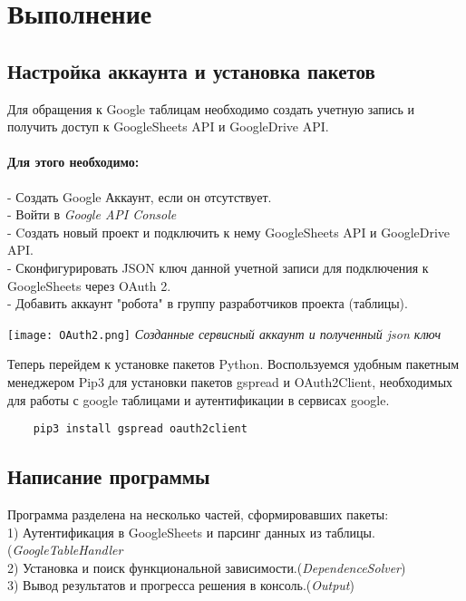 \newpage
	\section*{\centering Выполнение}
	
	\subsection*{Настройка аккаунта и установка пакетов}
	Для обращения к Google таблицам необходимо создать учетную запись и получить доступ к GoogleSheets API и GoogleDrive API.\\
	
	\paragraph{Для этого необходимо:\\
	}
	- Создать Google Аккаунт, если он отсутствует.\\
	- Войти в \textit{Google API Console}\\
	- Cоздать новый проект и подключить к нему GoogleSheets API и GoogleDrive API.\\
	- Сконфигурировать JSON ключ данной учетной записи для подключения к GoogleSheets через OAuth 2.\\
	- Добавить аккаунт "робота" в группу разработчиков проекта (таблицы).\\
    \begin{center}
        \texttt{[image: OAuth2.png]}
        \textit{Созданные сервисный аккаунт и полученный json ключ}
    \end{center}
	
	Теперь перейдем к установке пакетов Python. Воспользуемся удобным пакетным менеджером Pip3 для установки пакетов gspread и OAuth2Client, необходимых для работы с google таблицами и аутентификации  в сервисах google.
	\begin{lstlisting}
    pip3 install gspread oauth2client
    \end{lstlisting}
    
    \subsection*{Написание программы}
    Программа разделена на несколько частей, сформировавших пакеты:\\
    1) Аутентификация в GoogleSheets и парсинг данных из таблицы.(\textit{GoogleTableHandler}\\
    2) Установка и поиск функциональной зависимости.(\textit{DependenceSolver})\\
    3) Вывод результатов и прогресса решения в консоль.(\textit{Output})\\
    

